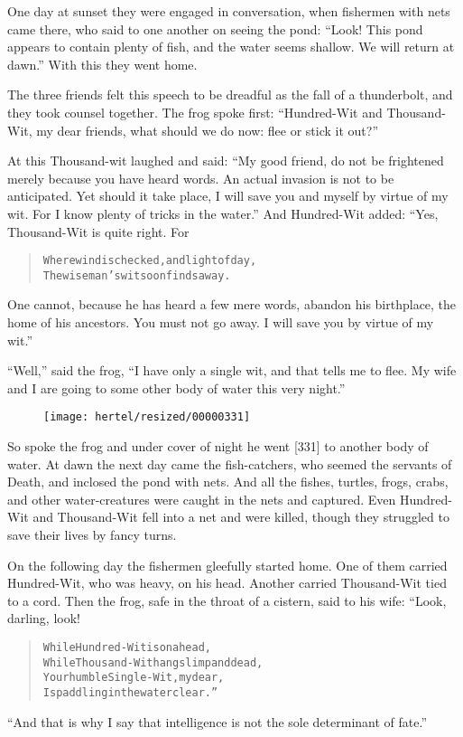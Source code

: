 \documentclass[article, twoside, 10pt]{memoir}
\renewenvironment{verbatim}{%
\begin{quote}%
\vskip -10pt%
\begin{alltt}\normalfont\small}{\end{alltt}%
\end{quote}%
\vskip -10pt
} %
\begin{document}
One day at sunset they were engaged in conversation, when fishermen
with nets came there, who said to one another on seeing the pond:
``Look! This pond appears to contain plenty of fish, and the water seems shallow. We will return at dawn.''
With this they went home.

The three friends felt this speech to be dreadful as the fall of a
thunderbolt, and they took counsel together. The frog spoke first:
``Hundred-Wit and Thousand-Wit, my dear friends, what should we do now: flee or stick it out?''

At this Thousand-wit laughed and said:
``My good friend, do not be frightened merely because you have heard words. An actual invasion is not to be anticipated. Yet should it take place, I will save you and myself by virtue of my wit. For I know plenty of tricks in the water.''
And Hundred-Wit added: “Yes, Thousand-Wit is quite right. For

\begin{verbatim}
Where wind is checked, and light of day,
The wise man's wit soon finds a way.
\end{verbatim}
One cannot, because he has heard a few mere words, abandon his
birthplace, the home of his ancestors. You must not go away. I will
save you by virtue of my wit.”

``Well,'' said the frog,
``I have only a single wit, and that tells me to flee. My wife and I are going to some other body of water this very night.''

\begin{figure}[p]\texttt{[image: hertel/resized/00000331]}\end{figure}So spoke the frog and under cover of night he went [331] to another
body of water. At dawn the next day came the fish-catchers, who
seemed the servants of Death, and inclosed the pond with nets. And
all the fishes, turtles, frogs, crabs, and other water-creatures
were caught in the nets and captured. Even Hundred-Wit and
Thousand-Wit fell into a net and were killed, though they struggled
to save their lives by fancy turns.

On the following day the fishermen gleefully started home. One of
them carried Hundred-Wit, who was heavy, on his head. Another
carried Thousand-Wit tied to a cord. Then the frog, safe in the
throat of a cistern, said to his wife: “Look, darling, look!

\begin{verbatim}
While Hundred-Wit is on a head,
While Thousand-Wit hangs limp and dead,
Your humble Single-Wit, my dear,
Is paddling in the water clear.”
\end{verbatim}
``And that is why I say that intelligence is not the sole determinant of fate.''
\end{document}
